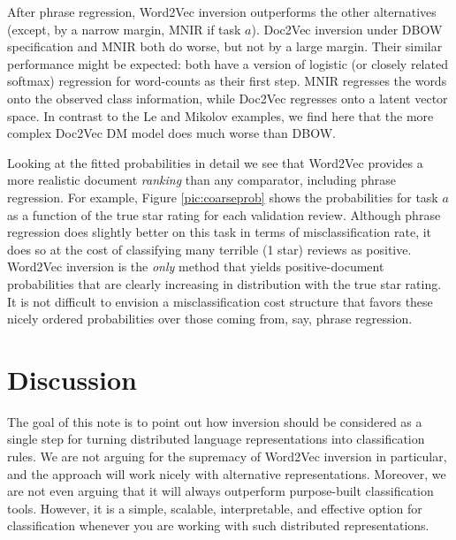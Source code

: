 \documentclass[11pt]{article}
\begin{document}
After phrase regression, Word2Vec inversion outperforms the other alternatives
(except, by a narrow margin, MNIR if task $a$).  Doc2Vec inversion under DBOW
specification and MNIR both do worse, but not by a large margin.  Their
similar performance might be expected: both have a version of logistic (or
closely related softmax) regression for word-counts as their first step.  MNIR
regresses the words onto the observed class information, while Doc2Vec
regresses onto a latent vector space.  In contrast to the Le and Mikolov
examples, we find here that the more complex Doc2Vec DM model does much worse
than DBOW.

Looking at the fitted probabilities in detail we see that Word2Vec provides a
more realistic document {\it ranking} than any comparator, including phrase
regression.  For example, Figure \ref{pic:coarseprob} shows the probabilities
for task $a$ as a function of the true star rating for each validation review.
Although phrase regression does slightly better on this task in terms of
misclassification rate, it does so at the cost of classifying many terrible (1
star) reviews as positive.  Word2Vec inversion is the {\it only} method that
yields positive-document probabilities that are clearly increasing in
distribution with the true star rating.  It is not difficult to envision a
misclassification cost structure that favors these nicely ordered probabilities
over those coming from, say, phrase regression.

\section{Discussion}

The goal of this note is to point out how inversion should be considered as a single step for turning distributed language representations into classification rules.  We are not arguing for the supremacy of Word2Vec inversion in particular, and the approach will work nicely with alternative representations.  Moreover, we are not even arguing that it will always outperform purpose-built classification tools.  However, it is a simple, scalable, interpretable, and effective option for classification whenever you are working with such distributed representations.



\end{document}

